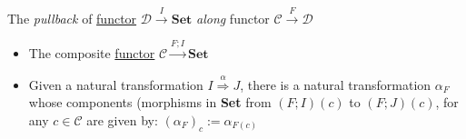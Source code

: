 The \emph{pullback} of \href{doc/1 math/Seven Sketches in Compositionality/Chapter 3: Databases/3 Functors, natural transformations, and databases/2 Functors/1 Functor}{functor} $\mathcal{D}\xrightarrow{I}\mathbf{Set}$ \emph{along} functor $\mathcal{C}\xrightarrow{F}\mathcal{D}$

\begin{itemize}
    \item  The composite \href{doc/1 math/Seven Sketches in Compositionality/Chapter 3: Databases/3 Functors, natural transformations, and databases/2 Functors/1 Functor}{functor} $\mathcal{C}\xrightarrow{F;I}\mathbf{Set}$
    \item Given a natural transformation $I \overset{\alpha}\Rightarrow J$, there is a natural transformation $\alpha_F$ whose components (morphisms in \textbf{Set} from $(F;I)(c)$ to $(F;J)(c)$, for any $c \in \mathcal{C}$ are given by: $(\alpha_F)_c := \alpha_{F(c)}$

  \end{itemize}
